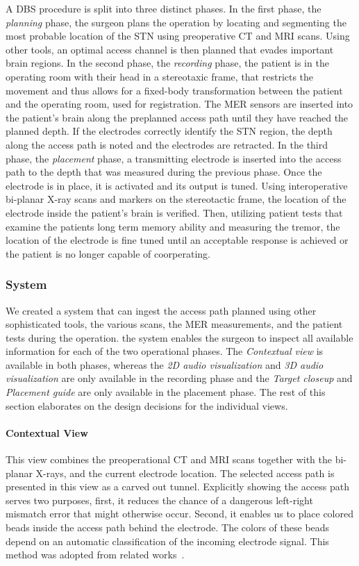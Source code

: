 A DBS procedure is split into three distinct phases. In the first phase, the \emph{planning} phase, the surgeon plans the operation by locating and segmenting the most probable location of the STN using preoperative CT and MRI scans. Using other tools, an optimal access channel is then planned that evades important brain regions. In the second phase, the \emph{recording} phase, the patient is in the operating room with their head in a stereotaxic frame, that restricts the movement and thus allows for a fixed-body transformation between the patient and the operating room, used for registration. The MER sensors are inserted into the patient's brain along the preplanned access path until they have reached the planned depth. If the electrodes correctly identify the STN region, the depth along the access path is noted and the electrodes are retracted. In the third phase, the \emph{placement} phase, a transmitting electrode is inserted into the access path to the depth that was measured during the previous phase. Once the electrode is in place, it is activated and its output is tuned. Using interoperative bi-planar X-ray scans and markers on the stereotactic frame, the location of the electrode inside the patient's brain is verified. Then, utilizing patient tests that examine the patients long term memory ability and measuring the tremor, the location of the electrode is fine tuned until an acceptable response is achieved or the patient is no longer capable of coorperating.

\subsubsection{System}
\label{contributions:medbio:dbs:system}
We created a system that can ingest the access path planned using other sophisticated tools, the various scans, the MER measurements, and the patient tests during the operation. the system enables the surgeon to inspect all available information for each of the two operational phases. The \emph{Contextual view} is available in both phases, whereas the \emph{2D audio visualization} and \emph{3D audio visualization} are only available in the recording phase and the \emph{Target closeup} and \emph{Placement guide} are only available in the placement phase. The rest of this section elaborates on the design decisions for the individual views.

\paragraph{Contextual View} This  view combines the preoperational CT and MRI scans together with the bi-planar X-rays, and the current electrode location. The selected access path is presented in this view as a carved out tunnel. Explicitly showing the access path serves two purposes, first, it reduces the chance of a dangerous left-right mismatch error that might otherwise occur. Second, it enables us to place colored beads inside the access path behind the electrode. The colors of these beads depend on an automatic classification of the incoming electrode signal. This method was adopted from related works~\cite{Haese2005, Miocinovic2007}.


